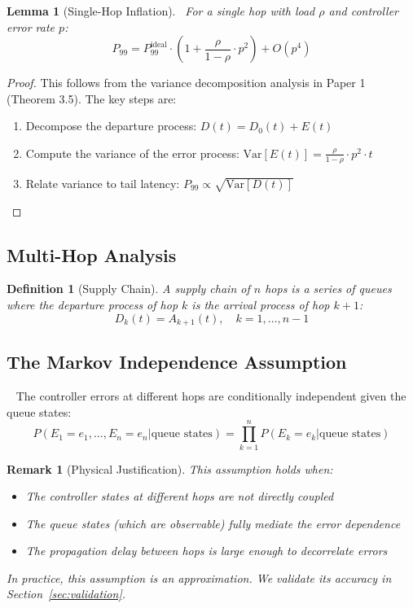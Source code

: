 \documentclass[11pt]{article}
\newtheorem{lemma}[theorem]{Lemma}
\newtheorem{definition}[theorem]{Definition}
\newtheorem{remark}[theorem]{Remark}
\begin{document}
\begin{lemma}[Single-Hop Inflation]~\label{lem:single-hop}
For a single hop with load $\rho$ and controller error rate $p$:
$$P_{99} = P_{99}^{\text{ideal}} \cdot \left(1 + \frac{\rho}{1-\rho} \cdot p^2\right) + O(p^4)$$
\end{lemma}

\begin{proof}
This follows from the variance decomposition analysis in Paper 1 (Theorem 3.5). The key steps are:
\begin{enumerate}
    \item Decompose the departure process: $D(t) = D_0(t) + E(t)$
    \item Compute the variance of the error process: $\text{Var}[E(t)] = \frac{\rho}{1-\rho} \cdot p^2 \cdot t$
    \item Relate variance to tail latency: $P_{99} \propto \sqrt{\text{Var}[D(t)]}$
\end{enumerate}
\end{proof}

\subsection{Multi-Hop Analysis}

\begin{definition}[Supply Chain]
A supply chain of $n$ hops is a series of queues where the departure process of hop $k$ is the arrival process of hop $k+1$:
$$D_k(t) = A_{k+1}(t), \quad k = 1, \ldots, n-1$$
\end{definition}

\subsection{The Markov Independence Assumption}

\begin{assumption}~\label{assumption:markov}
The controller errors at different hops are conditionally independent given the queue states:
$$P(E_1 = e_1, \ldots, E_n = e_n | \text{queue states}) = \prod_{k=1}^n P(E_k = e_k | \text{queue states})$$
\end{assumption}

\begin{remark}[Physical Justification]
This assumption holds when:
\begin{itemize}
    \item The controller states at different hops are not directly coupled
    \item The queue states (which are observable) fully mediate the error dependence
    \item The propagation delay between hops is large enough to decorrelate errors
\end{itemize}

In practice, this assumption is an approximation. We validate its accuracy in Section~\ref{sec:validation}.
\end{remark}
\end{document}
